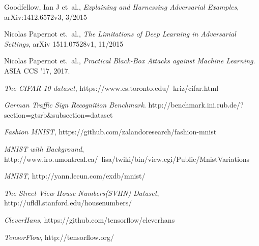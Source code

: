 \documentclass{article}
\begin{document}
\begin{thebibliography}{9}
\raggedright
{}
    Goodfellow, Ian J et\ al.,
    \emph{Explaining and Harnessing Adversarial Examples},  
    arXiv:1412.6572v3,
    3/2015

    Nicolas Papernot et.\ al.,
   \emph{The Limitations of Deep Learning in Adversarial Settings},
    arXiv 1511.07528v1,
    11/2015

    Nicolas Papernot et.\ al.,
    \emph{Practical Black-Box Attacks against Machine Learning}.
    ASIA CCS '17,
    2017.

    \emph{The CIFAR-10 dataset},
    https://www.cs.toronto.edu/~kriz/cifar.html

    \emph{German Traffic Sign Recognition Benchmark}.
    http://benchmark.ini.rub.de/?section=gtsrb\&subsection=dataset

    \emph{Fashion MNIST},
    https://github.com/zalandoresearch/fashion-mnist

    \emph{MNIST with Background},
    http://www.iro.umontreal.ca/~lisa/twiki/bin/view.cgi/Public/MnistVariations

    \emph{MNIST},
    http://yann.lecun.com/exdb/mnist/

    \emph{The Street View House Numbers(SVHN) Dataset},
    http://ufldl.stanford.edu/housenumbers/

    \emph{CleverHans},
    https://github.com/tensorflow/cleverhans

    \emph{TensorFlow},
    http://tensorflow.org/

\end{thebibliography}
\end{document}
